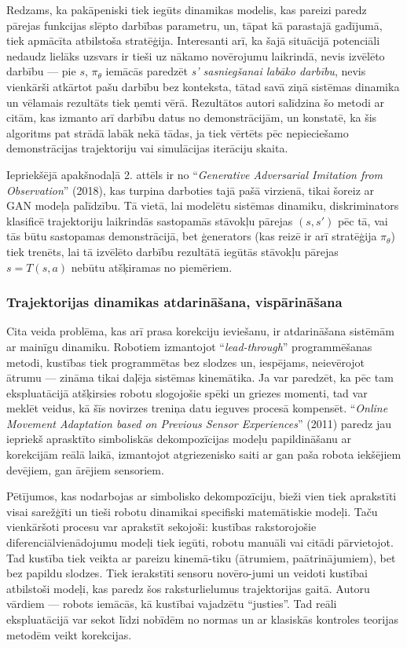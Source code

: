 \documentclass[12pt, a4paper]{article}
\numberwithin{equation}{section} %
\begin{document}
Redzams, ka pakāpeniski tiek iegūts dinamikas modelis, kas pareizi paredz pārejas funkcijas slēpto darbības parametru, un, tāpat kā parastajā gadījumā, tiek apmācīta atbilstoša stratēģija. Interesanti arī, ka šajā situācijā potenciāli nedaudz lielāks uzsvars ir tieši uz nākamo novērojumu laikrindā, nevis izvēlēto darbību --- pie $s$, $\pi_{\theta}$ iemācās paredzēt \textit{s' sasniegšanai labāko darbību}, nevis vienkārši atkārtot pašu darbību bez konteksta, tātad savā ziņā sistēmas dinamika un vēlamais rezultāts tiek ņemti vērā. Rezultātos autori salīdzina šo metodi ar citām, kas izmanto arī darbību datus no demonstrācijām, un konstatē, ka šis algoritms pat strādā labāk nekā tādas, ja tiek vērtēts pēc nepieciešamo demonstrācijas trajektoriju vai simulācijas iterāciju skaita.

Iepriekšējā apakšnodaļā 2. attēls ir no ``\textit{Generative Adversarial Imitation from Observation}'' \cite{torabi2018behavioral} (2018), kas turpina darboties tajā pašā virzienā, tikai šoreiz ar GAN modeļa palīdzību. Tā vietā, lai modelētu sistēmas dinamiku, diskriminators klasificē trajektoriju laikrindās sastopamās stāvokļu pārejas $(s, s')$ pēc tā, vai tās būtu sastopamas demonstrācijā, bet ģenerators (kas reizē ir arī stratēģija $\pi_{\theta}$) tiek trenēts, lai tā izvēlēto darbību rezultātā iegūtās stāvokļu pārejas $s=T(s,a)$ nebūtu atšķiramas no piemēriem.

\subsubsection{Trajektorijas dinamikas atdarināšana, vispārināšana}

Cita veida problēma, kas arī prasa korekciju ieviešanu, ir atdarināšana sistēmām ar mainīgu dinamiku. Robotiem izmantojot ``\textit{lead-through}'' programmēšanas metodi, kustības tiek programmētas bez slodzes un, iespējams, neievērojot ātrumu --- zināma tikai daļēja sistēmas kinemātika. Ja var paredzēt, ka pēc tam ekspluatācijā atšķirsies robotu slogojošie spēki un griezes momenti, tad var meklēt veidus, kā šīs novirzes treniņa datu ieguves procesā kompensēt. ``\textit{Online Movement Adaptation based on Previous Sensor Experiences}'' \cite{pastor2011online} (2011) paredz jau iepriekš aprasktīto simboliskās dekompozīcijas modeļu papildināšanu ar korekcijām reālā laikā, izmantojot atgriezenisko saiti ar gan paša robota iekšējiem devējiem, gan ārējiem sensoriem. 

Pētījumos, kas nodarbojas ar simbolisko dekompozīciju, bieži vien tiek aprakstīti visai sarežģīti un tieši robotu dinamikai specifiski matemātiskie modeļi. Taču vienkāršoti procesu var aprakstīt sekojoši: kustības rakstorojošie diferenciālvienādojumu modeļi tiek iegūti, robotu manuāli vai citādi pārvietojot. Tad kustība tiek veikta ar pareizu kinemā-tiku (ātrumiem, paātrinājumiem), bet bez papildu slodzes. Tiek ierakstīti sensoru novēro-jumi un veidoti kustībai atbilstoši modeļi, kas paredz šos raksturlielumus trajektorijas gaitā. Autoru vārdiem --- robots iemācās, kā kustībai vajadzētu ``justies''. Tad reāli ekspluatācijā var sekot līdzi nobīdēm no normas un ar klasiskās kontroles teorijas metodēm veikt korekcijas.
\end{document}
